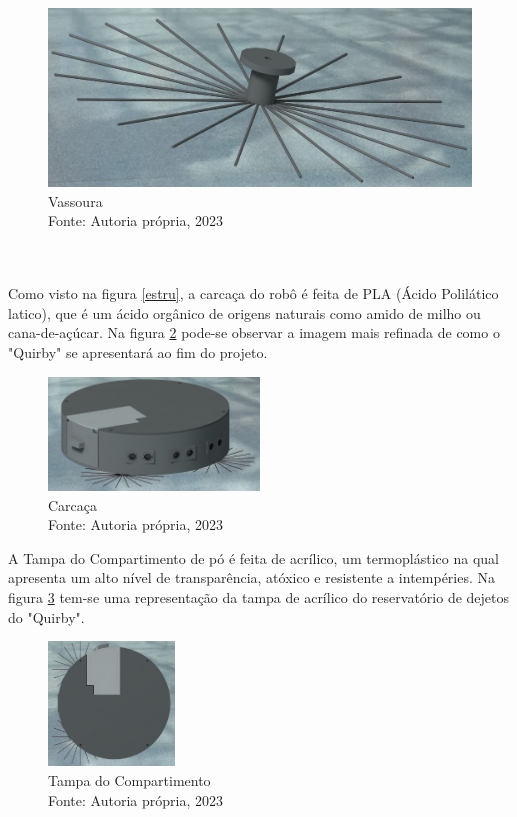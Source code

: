 \begin{figure}[h!]
\includegraphics[height=3.8 cm, width=16 cm]{figuras/Vassoura1.jpg}
\caption{Vassoura \\ Fonte: Autoria própria, 2023}
\label{vass}
\end{figure}



\\
\\

Como visto na figura \ref{estru}, a carcaça do robô é feita de PLA (Ácido Polilático latico), que é um ácido orgânico de origens naturais como amido de milho ou cana-de-açúcar.
Na figura \ref{fig1} pode-se observar a imagem mais refinada de como o "Quirby" se apresentará ao fim do projeto.
\begin{figure}[h!]
\begin{center}
\includegraphics[width=0.5\textwidth]{figuras/isometrica.jpg}
\caption{Carcaça \\ Fonte: Autoria própria, 2023}
\label{fig1}
\end{center}
\end{figure}

A Tampa do Compartimento de pó é feita de acrílico, um termoplástico na qual apresenta um alto nível de transparência, atóxico e resistente a intempéries. Na figura \ref{tampa} tem-se uma representação da tampa de acrílico do reservatório de dejetos do "Quirby".

\begin{figure}[h]
\begin{center}
\includegraphics[width=0.3\textwidth]{figuras/superior.jpg}
\caption{Tampa do Compartimento\\Fonte: Autoria própria, 2023}
\label{tampa}
\end{center}
\end{figure}

